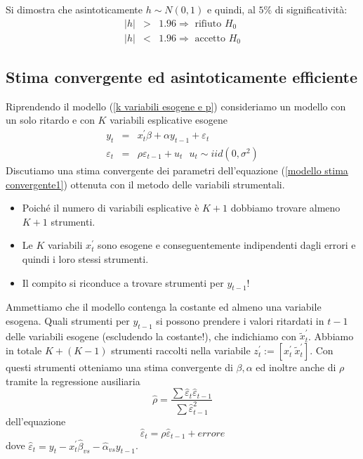 \documentclass[a4paper]{report}
\theoremstyle{remark}
\begin{document}
Si dimostra che asintoticamente $h\sim N(0,1)$ e quindi, al $5\%$ di
significativit\`{a}:%
\begin{eqnarray*}
|h| &>&1.96\Rightarrow \text{ rifiuto }H_{0} \\
|h| &<&1.96\Rightarrow \text{ accetto }H_{0}
\end{eqnarray*}

\subsection{Stima convergente ed asintoticamente efficiente}

Riprendendo il modello (\ref{k variabili esogene e p}) consideriamo un
modello con un solo ritardo e con $K$ variabili esplicative esogene%
\begin{eqnarray}
y_{t} &=&x_{t}^{\prime }\beta +\alpha y_{t-1}+\varepsilon _{t}
\label{modello stima convergente1} \\
\varepsilon _{t} &=&\rho \varepsilon _{t-1}+u_{t}\ \ \ u_{t}\sim
iid(0,\sigma ^{2})  \label{modello stima convergente2}
\end{eqnarray}%
Discutiamo una stima convergente dei parametri dell'equazione (\ref{modello
stima convergente1}) ottenuta con il metodo delle variabili strumentali.

\begin{itemize}
\item Poich\'{e} il numero di variabili esplicative \`{e} $K+1$ dobbiamo
trovare almeno $K+1$ strumenti.

\item Le $K$ variabili $x_{t}^{\prime }$ sono esogene e conseguentemente
indipendenti dagli errori e quindi i loro stessi strumenti.

\item Il compito si riconduce a trovare strumenti per $y_{t-1}$!
\end{itemize}

\noindent Ammettiamo che il modello contenga la costante ed almeno una
variabile esogena. Quali strumenti per $y_{t-1}$ si possono prendere i
valori ritardati in $t-1$ delle variabili esogene (escludendo la costante!),
che indichiamo con $\widetilde{x}_{t}^{\prime }$. Abbiamo in totale $K+(K-1)$
strumenti raccolti nella variabile $z_{t}^{\prime }:=[x_{t}^{\prime }\ 
\widetilde{x}_{t}^{\prime }]$. Con questi strumenti otteniamo una stima
convergente di $\beta ,\alpha $ ed inoltre anche di $\rho $ tramite la
regressione ausiliaria%
\begin{equation}
\widehat{\rho }=\frac{\sum \widehat{\varepsilon }_{t}\widehat{\varepsilon }%
_{t-1}}{\sum \widehat{\varepsilon }_{t-1}^{2}}  \label{stima di rho}
\end{equation}%
dell'equazione%
\begin{equation*}
\widehat{\varepsilon }_{t}=\rho \widehat{\varepsilon }_{t-1}+errore
\end{equation*}%
dove $\widehat{\varepsilon }_{t}=y_{t}-x_{t}^{\prime }\widehat{\beta }_{vs}-%
\widehat{\alpha }_{vs}y_{t-1}$.
\end{document}
